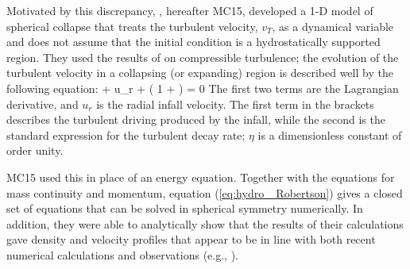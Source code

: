 \documentclass[../dissertation.tex]{subfiles}
\begin{document}
Motivated by this discrepancy,
\citet{2015ApJ...804...44M}, hereafter MC15, developed a 1-D model of
spherical collapse that treats the turbulent velocity, $v_T$, as a dynamical variable and
does not assume that the initial condition is a hydrostatically
supported region. They used the results of \citet{2012ApJ...750L..31R} on
compressible turbulence; the evolution
of the turbulent velocity in a collapsing (or expanding) region is
described well by the following equation:
%
\be
{} + u_{r}  
+ \left( 1 + \eta {} \right)  = 0
\label{eq:hydro_ Robertson}
\ee
%
The first two terms are the Lagrangian derivative, and $u_r$ is the radial infall velocity. The first term in the brackets 
describes the turbulent driving produced by the infall, while the second 
is the standard expression for the turbulent decay rate;  $\eta$ is a dimensionless constant of order unity.

MC15 used this in place of an energy equation. Together with the
equations for mass continuity and momentum, equation (\ref{eq:hydro_ Robertson}) gives a
closed set of equations that can be solved in spherical symmetry
numerically. In addition, they were able to analytically show that the
results of their calculations gave density and velocity profiles that
appear to be in line with both recent numerical calculations
\citep{2015ApJ...800...49L} and observations (e.g.,
\citealt{1995ApJ...446..665C,1997ApJ...476..730P}).
\end{document}
